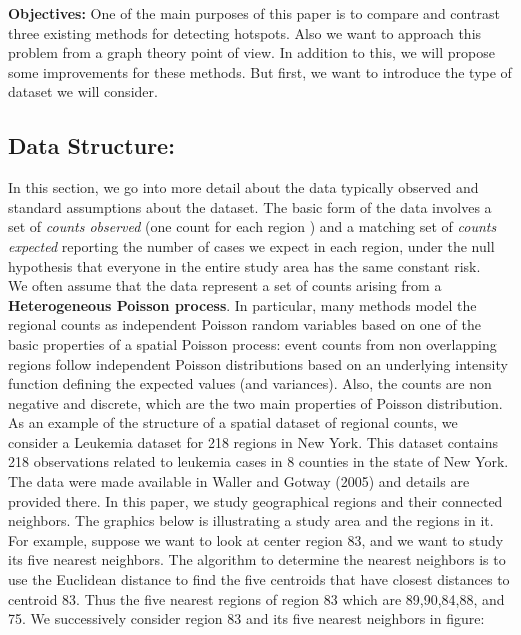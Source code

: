\documentclass[12pt]{article}
\begin{document}
			\textbf{Objectives:} One of the main purposes of this paper is to compare and contrast three existing methods for detecting hotspots. Also we want to approach this problem from a graph theory point of view. In addition to this, we will propose some improvements for these methods. But first, we want to introduce the type of dataset we will consider. \\
				
		\subsection{Data Structure:} 
			In this section, we go into more detail about the data typically observed and standard assumptions about the dataset. 
			The basic form of the data involves a set of \textit{counts observed} (one count for each region ) and a matching set of \textit{counts expected} reporting the number of cases we expect in each region, under the null hypothesis that everyone in the entire study area has the same constant risk. \\
			
We often assume that the data represent a set of counts arising from a \textbf{Heterogeneous Poisson process}.
In particular, many methods model the regional counts as independent Poisson random variables based on one of the basic properties of a spatial Poisson process: event counts from non overlapping regions follow independent Poisson distributions based on an underlying intensity function defining the expected values (and variances). Also, the counts are non negative and discrete, which are the two main properties of Poisson distribution. \\
			 
			
			
			As an example of the structure of a spatial dataset of regional counts, we consider a Leukemia dataset for 218 regions in New York. This dataset contains 218 observations related to leukemia cases in 8 counties in the state of New York. The data were made available in Waller and Gotway (2005) and details are provided there. In this paper, we study geographical regions and their connected neighbors.		
The graphics below is illustrating a study area and the regions in it. For example, suppose we want to look at center region 83, and we want to study its five nearest neighbors. The algorithm to determine the nearest neighbors is to use the Euclidean distance to find the five centroids that have closest distances to centroid 83. Thus the five nearest regions of region 83 which are 89,90,84,88, and 75. We successively consider region 83 and its five nearest neighbors in figure: \\	
	\newpage
	
\end{document}
